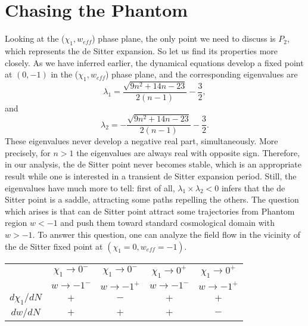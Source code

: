 \documentclass[a4paper,11pt]{article}
\begin{document}
\section{Chasing the Phantom}
Looking at the ($\chi_1,w_{eff}$) phase plane, the only point we need to discuss is $P_2$, which represents the de Sitter expansion. So let us find its properties more closely. As we have inferred earlier, the dynamical equations develop a fixed point at $(0,-1)$ in the ($\chi_1,w_{eff}$) phase plane, and the corresponding eigenvalues are
\begin{equation}
 \lambda_{1}=\frac{\sqrt{9 n^2+14 n-23}}{2 (n-1)}-\frac{3}{2},
\end{equation}
and
\begin{equation}
 \lambda_{2}=-\frac{\sqrt{9 n^2+14 n-23}}{2 (n-1)}-\frac{3}{2}.
\end{equation}
These eigenvalues never develop a negative real part, simultaneously. More precisely, for $n>1$ the eigenvalues are always real with opposite sign. Therefore, in our analysis, the de Sitter point never becomes stable, which is an appropriate result while one is interested in a transient de Sitter expansion period. Still, the eigenvalues have much more to tell: first of all, $\lambda_1\times\lambda_2<0$ infers that the de Sitter point is a saddle, attracting some paths repelling the others. The question which arises is that can de Sitter point attract some trajectories from Phantom region $w<-1$ and push them toward standard cosmological domain with $w>-1$. To answer this question, one can analyze the field flow in the vicinity of the de Sitter fixed point at  $(\chi_1=0,w_{eff}=-1)$. 


\begin{center}
  \begin{tabular}{ | c || c | c | c | c |}
    \hline
       & $\chi_1\rightarrow 0^-$ &$\chi_1\rightarrow 0^-$  & $\chi_1\rightarrow 0^+$& $\chi_1\rightarrow 0^+$\\
       & $w\rightarrow -1^-$ & $w\rightarrow -1^+$ & $w\rightarrow -1^-$& $w\rightarrow -1^+$ \\ \hline\hline
    ${d \chi_1}/{d N}$ &$+$ & $-$ & $+$ & $+$\\ \hline
    ${d w}/{d N}$ &$+$ & $+$ & $+$ & $-$\\
    \hline
      \end{tabular}
      \captionsetup{width=0.9\linewidth, font=small}
\label{tab} 
\end{center}
\end{document}

